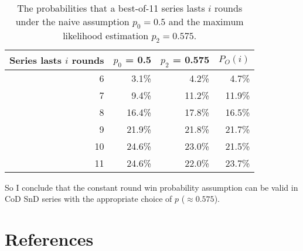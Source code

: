 \documentclass{article}
\begin{document}
\begin{longtable}[]{@{}rrrr@{}}
\caption{The probabilities that a best-of-11 series lasts $i$ rounds under the naive assumption $p_0 = 0.5$ and the maximum likelihood estimation $p_2 = 0.575$.}\label{tbl:expected-series-lengths-alternative-ps} \\
\toprule()
Series lasts \(i\) rounds & \(p_0\) = 0.5 & \(p_2\) = 0.575 & \(P_O(i)\) \\
\midrule()
\endhead
6 & 3.1\% & 4.2\% & 4.7\% \\
7 & 9.4\% & 11.2\% & 11.9\% \\
8 & 16.4\% & 17.8\% & 16.5\% \\
9 & 21.9\% & 21.8\% & 21.7\% \\
10 & 24.6\% & 23.0\% & 21.5\% \\
11 & 24.6\% & 22.0\% & 23.7\% \\
\bottomrule()
\end{longtable}

So I conclude that the constant round win probability assumption can be
valid in CoD SnD series with the appropriate choice of \(p\)
(\(\approx 0.575\)).

\hypertarget{references}{%
\section*{References}\label{references}}
\end{document}
